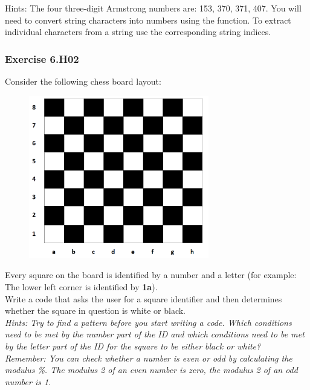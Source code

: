 Hints:
The four three-digit Armstrong numbers are: 153, 370, 371, 407.
You will need to convert string characters into numbers using the {} function. To extract individual characters from a string use the corresponding string indices.\\[1cm]



\subsubsection*{Exercise 6.H02}
Consider the following chess board layout:
\begin{figure}[H]
		\centering
		\includegraphics[width=0.7\textwidth]{../IMG/6H02.png} 
\end{figure}

Every square on the board is identified by a number and a letter (for example: The lower left
corner is identified by \textbf{1a}).\\
Write a code that asks the user for a square identifier and then determines whether the
square in question is white or black.\\


\textit{Hints:
Try to find a pattern before you start writing a code. Which conditions need to be met by the
number part of the ID and which conditions need to be met by the letter part of the ID for the
square to be either black or white?\\
Remember: You can check whether a number is even or odd by calculating the modulus \%.
The modulus 2 of an even number is zero, the modulus 2 of an odd number is 1.}

